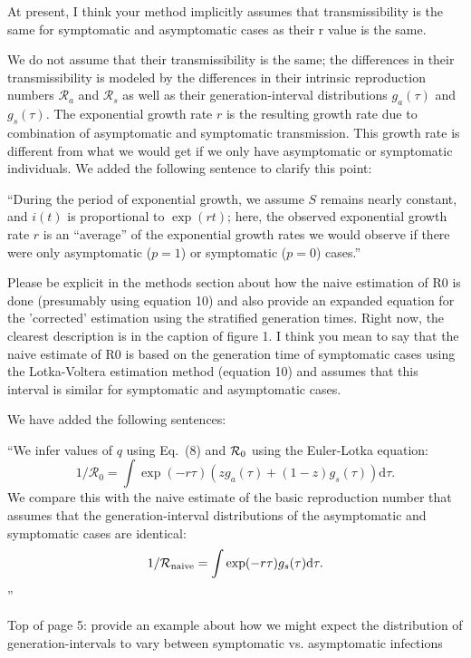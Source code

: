 \documentclass[12pt]{article}
\newcommand{\revtext}{\textsf}
\begin{document}
\revtext{At present, I think your method implicitly assumes that transmissibility is the same for symptomatic and asymptomatic cases as their r value is the same.}

We do not assume that their transmissibility is the same; the differences in their transmissibility is modeled by the differences in their intrinsic reproduction numbers $\mathcal R_a$ and $\mathcal R_s$ as well as their generation-interval distributions $g_a(\tau)$ and $g_s(\tau)$. The exponential growth rate $r$ is the resulting growth rate due to combination of asymptomatic and symptomatic transmission. This growth rate is different from what we would get if we only have asymptomatic or symptomatic individuals. We added the following sentence to clarify this point:

``During the period of exponential growth, we assume $S$ remains nearly constant, and $i(t)$ is proportional to $\exp(r t)$;
here, the observed exponential growth rate $r$ is an ``average'' of the exponential growth rates we would observe if there were only asymptomatic ($p=1$) or symptomatic ($p=0$) cases.''

\revtext{Please be explicit in the methods section about how the naive estimation of R0 is done (presumably using equation 10) and also provide an expanded equation for the 'corrected' estimation using the stratified generation times. Right now, the clearest description is in the caption of figure 1.  I think you mean to say that the naive estimate of R0 is based on the generation time of symptomatic cases using the Lotka-Voltera estimation method (equation 10) and assumes that this interval is similar for symptomatic and asymptomatic cases.}

We have added the following sentences:

``We infer values of $q$ using Eq.~(8) and ${\cal{R}}_0$ using the Euler-Lotka equation:
\begin{equation}
1/\mathcal R_0 = \int \exp(-r \tau) \left(z g_a(\tau) + (1-z) g_s(\tau)\right) \mathrm{d} \tau.
\end{equation}
We compare this with the naive estimate of the basic reproduction number that assumes that the generation-interval distributions of the asymptomatic and symptomatic cases are identical:
\begin{equation}
1/\mathcal R_{\tiny \textrm{naive}} = \int \exp(-r \tau) g_s(\tau) \mathrm{d} \tau.
\end{equation}''

\revtext{Top of page 5: provide an example about how we might expect the distribution of generation-intervals to vary between symptomatic vs. asymptomatic infections}
\end{document}
